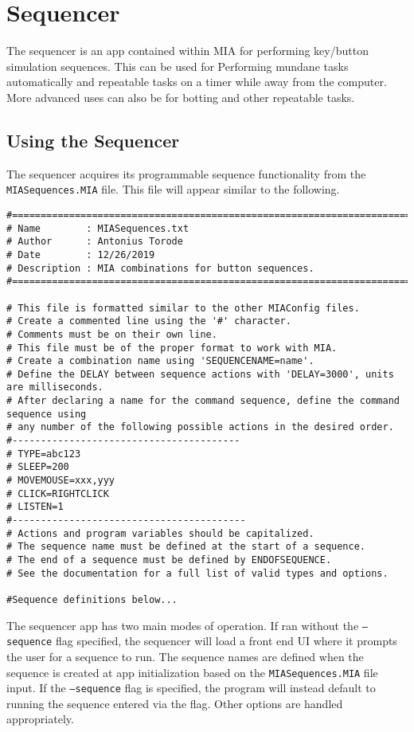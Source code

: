 \chapter{Sequencer} \label{sequencer}
\pagestyle{fancy}

The sequencer is an app contained within MIA for performing key/button simulation sequences. This can be used for Performing mundane tasks automatically and repeatable tasks on a timer while away from the computer. More advanced uses can also be for botting and other repeatable tasks.

\section{Using the Sequencer}

The sequencer acquires its programmable sequence functionality from the \texttt{MIASequences.MIA} file. This file will appear similar to the following.

\begin{lstlisting}[style=pythonstyle]
#============================================================================
# Name        : MIASequences.txt
# Author      : Antonius Torode
# Date        : 12/26/2019
# Description : MIA combinations for button sequences.
#============================================================================

# This file is formatted similar to the other MIAConfig files.
# Create a commented line using the '#' character. 
# Comments must be on their own line.
# This file must be of the proper format to work with MIA.
# Create a combination name using 'SEQUENCENAME=name'.
# Define the DELAY between sequence actions with 'DELAY=3000', units are milliseconds.
# After declaring a name for the command sequence, define the command sequence using 
# any number of the following possible actions in the desired order.
#----------------------------------------
# TYPE=abc123
# SLEEP=200
# MOVEMOUSE=xxx,yyy
# CLICK=RIGHTCLICK
# LISTEN=1
#-----------------------------------------
# Actions and program variables should be capitalized.
# The sequence name must be defined at the start of a sequence.
# The end of a sequence must be defined by ENDOFSEQUENCE.
# See the documentation for a full list of valid types and options.

#Sequence definitions below...
\end{lstlisting}

The sequencer app has two main modes of operation. If ran without the \texttt{--sequence} flag specified, the sequencer will load a front end UI where it prompts the user for a sequence to run. The sequence names are defined when the sequence is created at app initialization based on the \texttt{MIASequences.MIA} file input. If the \texttt{--sequence} flag is specified, the program will instead default to running the sequence entered via the flag. Other options are handled appropriately.


